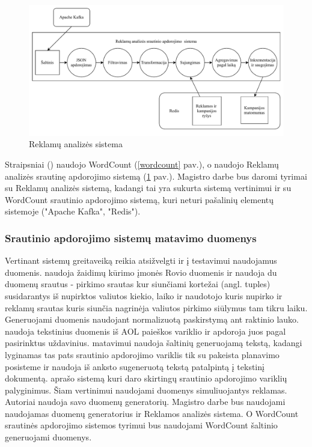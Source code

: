 \documentclass{VUMIFPSbakalaurinis}
\begin{document}
\begin{figure}[H]
    \includegraphics[width=15cm]{img/yahoo.pdf}
    \caption{Reklamų analizės sistema \cite{Chintapalli2016Benchmarking}}
    \label{yahoo}
\end{figure} 

Straipsniai (\cite{Qian2016Benchmarking, huang2010hibench, dhalion}) naudojo WordCount (\ref{wordcount} pav.), o \cite{Chintapalli2016Benchmarking, vaquero2018autotuning} naudojo Reklamų analizės srautinę apdorojimo sistemą (\ref{yahoo} pav.). Magistro darbe bus daromi tyrimai su Reklamų analizės sistemą, kadangi tai yra sukurta sistemą vertinimui ir su WordCount srautinio apdorojimo sistemą, kuri neturi pašalinių elementų sistemoje ("Apache Kafka", "Redis").    

\subsubsection{Srautinio apdorojimo sistemų matavimo duomenys}

Vertinant sistemų greitaveiką reikia atsižvelgti ir į testavimui naudojamus duomenis. \cite{Karimov2018BenchmarkingDS} naudoja žaidimų kūrimo įmonės Rovio duomenis ir naudoja du duomenų srautus - pirkimo srautas kur siunčiami kortežai (angl. tuples) susidarantys iš nupirktos valiutos kiekio, laiko ir naudotojo kuris nupirko ir reklamų srautas kuris siunčia nagrinėja valiutos pirkimo siūlymus tam tikru laiku. Generuojami duomenis naudojant normalizuotą paskirstymą ant raktinio lauko. \cite{Qian2016Benchmarking} naudoja tekstinius duomenis iš AOL paieškos variklio ir apdoroja juos pagal pasirinktus uždavinius. \cite{zhang2020heron} matavimui naudoja šaltinių generuojamą tekstą, kadangi lyginamas tas pats srautinio apdorojimo variklis tik su pakeista planavimo posisteme ir naudoja iš anksto sugeneruotą tekstą patalpintą į tekstinį dokumentą. \cite{Chintapalli2016Benchmarking} aprašo sistemą kuri daro skirtingų srautinio apdorojimo variklių palyginimus. Šiam vertinimui naudojami duomenys simuliuojantys reklamas. Autoriai naudoja savo duomenų generatorių.
Magistro darbe bus naudojami \cite{Chintapalli2016Benchmarking} naudojamas duomenų generatorius ir Reklamos analizės sistema. O WordCount srautinės apdorojimo sistemos tyrimui bus naudojami WordCount šaltinio generuojami duomenys.
\end{document}
